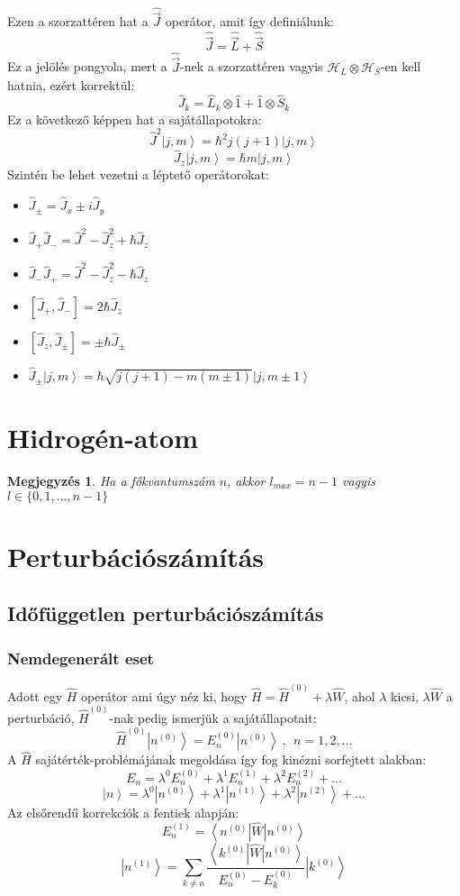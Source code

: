 \documentclass[12pt]{article}
\theoremstyle{plain}
\newcommand{\ket}[1]{\left| #1 \right >}
\newcommand{\bra}[1]{\left < #1 \right |}
\newcommand{\commut}[2]{\left [ #1 , #2 \right]}
\newtheorem*{megj}{Megjegyzés}
\begin{document}
Ezen a szorzattéren hat a $\hat{\vec J}$ operátor, amit így definiálunk:
\[
    \hat{\vec J} = \hat{\vec L} + \hat{\vec S}
\]
Ez a jelölés pongyola, mert a $\hat{\vec J}$-nek a szorzattéren vagyis $\mathcal{H}_L \otimes \mathcal{H}_S$-en kell hatnia,
ezért korrektül:
\[
    \hat J_k = \hat L_k \otimes \hat 1 + \hat 1 \otimes \hat S_k
\]
Ez a következő képpen hat a sajátállapotokra:
\[
    \hat J^2 \ket{j, m} = \hbar^2 j(j+1)\ket{j,m}
\]
\[
    \hat J_z \ket{j, m} = \hbar m\ket{j,m}
\]
Szintén be lehet vezetni a léptető operátorokat:
\begin{itemize}
    \item $
        \hat J_{\pm} = \hat J_x \pm  i \hat J_y
    $
    \item $
       \hat J_+ \hat J_-  = \hat J ^2 - \hat J_z^2 + \hbar \hat J_z
    $
    \item $
       \hat J_- \hat J_+  = \hat J ^2 - \hat J_z^2 - \hbar \hat J_z
    $
    \item $
        \commut{\hat J_+}{\hat J_-} = 2 \hbar \hat J_z
    $
    \item $
        \commut{\hat J_z}{\hat J_{\pm}} = \pm \hbar \hat J_{\pm}
    $
    \item $
        \hat J_{\pm}\ket{j,m} = \hbar \sqrt{j(j+1) - m(m\pm1)}\ket{j,m\pm1}
    $
\end{itemize}
\section{Hidrogén-atom}
\begin{megj}
    Ha a főkvantumszám $n$, akkor $l_{max}=n-1$ vagyis $l \in \{0,1,...,n-1\}$
\end{megj}
\section{Perturbációszámítás}
\subsection{Időfüggetlen perturbációszámítás}
\subsubsection{Nemdegenerált eset}
Adott egy $\hat H$ operátor ami úgy néz ki, hogy $\hat H = \hat H^{(0)} + \lambda \hat W$, ahol $\lambda$ kicsi, 
$\lambda\hat W$ a perturbáció, $\hat H^{(0)}$-nak pedig ismerjük a sajátállapotait:
\[
    \hat H^{(0)} \ket{n^{(0)}} = E_n^{(0)} \ket{n^{(0)}} ~, ~~ n=1,2,... 
\]
A $\hat H$ sajátérték-problémájának megoldása így fog kinézni sorfejtett alakban:
\[
    E_n = \lambda^0 E_n^{(0)} + \lambda^1 E_n^{(1)} + \lambda^2 E_n^{(2)} + ...
\]
\[
  \ket n = \lambda^0 \ket{n^{(0)}} + \lambda^1 \ket{n^{(1)}} + \lambda^2 \ket{n^{(2)}} + ...  
\]
Az elsőrendű korrekciók a fentiek alapján:
\[
    E_n^{(1)} = \bra{n^{(0)}} \hat W \ket{n^{(0)}}      
\]
\[
    \ket{n^{(1)}} = \sum\limits_{k\neq n}\frac{\bra{k^{(0)}} \hat W \ket{n^{(0)}}}{E_n^{(0)}-E_k^{(0)}}
    \ket{k^{(0)}}
\]
\end{document}
